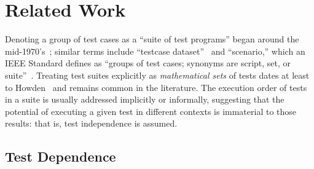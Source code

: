 \section{Related Work}
\label{sec:related}


Denoting a group of test cases as a ``suite of test programs'' began around the
mid-1970's~\cite[p.~217]{brown:CSUR:1974}; similar terms include
``testcase dataset''~\cite{milleretal:ICRS:1975} and ``scenario,''
which an IEEE Standard defines as ``groups of test cases;
synonyms are script, set, or suite''~\cite[p.~10]{IEEE:829-1998}.
Treating test suites explicitly as \emph{mathematical sets} of tests dates at least
to Howden~\cite[p.~554]{howden:ToC:1975} and remains common in the literature.
The execution order of tests in a suite is usually addressed implicitly
or informally, suggesting that the potential of executing a given test
in different contexts is immaterial to those results: that is, test
independence is assumed. 




\subsection{Test Dependence}

